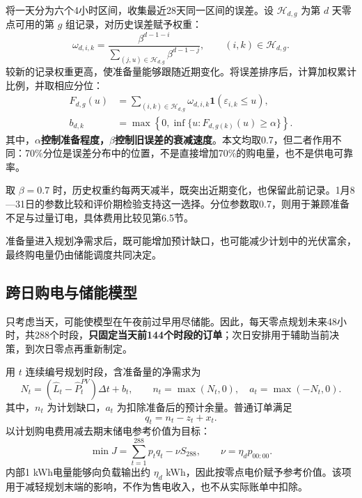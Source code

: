 将一天分为六个4小时区间，收集最近28天同一区间的误差。设 $\mathcal H_{d,g}$ 为第 $d$ 天零点可用的第 $g$ 组记录，对历史误差赋予权重：
\begin{equation}
\omega_{d,i,k}=\frac{\beta^{d-1-i}}{\displaystyle\sum_{(j,u)\in\mathcal H_{d,g}}\beta^{d-1-j}},\qquad (i,k)\in\mathcal H_{d,g}.
\label{eq:q2_weight}
\end{equation}
较新的记录权重更高，使准备量能够跟随近期变化。将误差排序后，计算加权累计比例，并取相应分位：
\begin{align}
F_{d,g}(u)&=\sum_{(i,k)\in\mathcal H_{d,g}}\omega_{d,i,k}\mathbf1(\varepsilon_{i,k}\le u),\label{eq:q2_cdf}\\
b_{d,k}&=\max\left\{0,\inf\{u:F_{d,g(k)}(u)\ge\alpha\}\right\}.\label{eq:q2_reserve}
\end{align}
其中，\textbf{$\alpha$控制准备程度，$\beta$控制旧误差的衰减速度}。本文均取0.7，但二者作用不同：70\%分位是误差分布中的位置，不是直接增加70\%的购电量，也不是供电可靠率。

取 $\beta=0.7$ 时，历史权重约每两天减半，既突出近期变化，也保留此前记录。1月8—31日的参数比较和评价期检验支持这一选择。分位参数取0.7，则用于兼顾准备不足与过量订电，具体费用比较见第6.5节。

准备量进入规划净需求后，既可能增加预计缺口，也可能减少计划中的光伏富余，最终购电量仍由储能调度共同决定。

\subsection{跨日购电与储能模型}
只考虑当天，可能使模型在午夜前过早用尽储能。因此，每天零点规划未来48小时，共288个时段，\textbf{只固定当天前144个时段的订单}；次日安排用于辅助当前决策，到次日零点再重新制定。

用 $t$ 连续编号规划时段，含准备量的净需求为
\begin{equation}
N_t=(\widehat L_t-\widehat P^{PV}_t)\Delta t+b_t,\qquad
n_t=\max(N_t,0),\quad a_t=\max(-N_t,0).
\label{eq:q2_net_demand}
\end{equation}
其中，$n_t$ 为计划缺口，$a_t$ 为扣除准备后的预计余量。普通订单满足
\begin{equation}
q_t=n_t-z_t+x_t.
\label{eq:q2_purchase}
\end{equation}
以计划购电费用减去期末储电参考价值为目标：
\begin{equation}
\min J=\sum_{t=1}^{288}p_tq_t-\nu S_{288},\qquad \nu=\eta_dp_{00:00}.
\label{eq:q2_objective}
\end{equation}
内部1 kWh电量能够向负载输出约 $\eta_d$ kWh，因此按零点电价赋予参考价值。该项用于减轻规划末端的影响，不作为售电收入，也不从实际账单中扣除。

